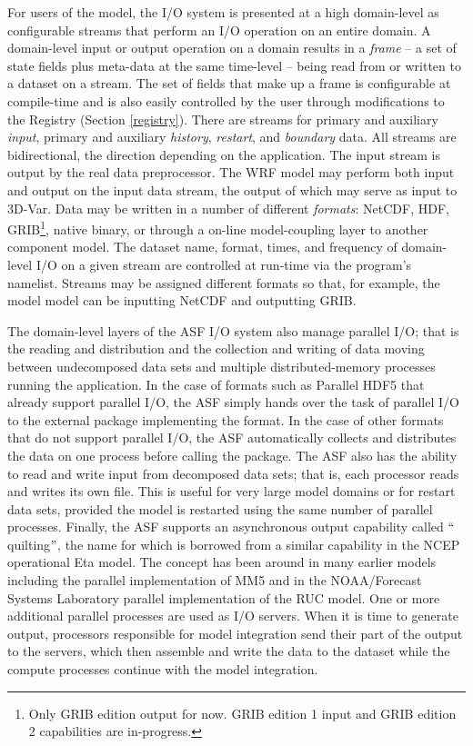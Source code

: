 For users of the model, the I/O system is presented at a high
domain-level as configurable streams that perform an I/O operation
on an entire domain. A domain-level input or output operation on a domain
results in a {\em frame} -- a set of state fields plus meta-data at the same
time-level -- being read from or written to a dataset on a stream.
The set of fields that make up a frame is configurable at compile-time
and is also easily controlled by the user through modifications to the
Registry (Section \ref{registry}).  There are streams for
primary and auxiliary {\em input}, primary and auxiliary {\em history}, {\em restart}, and
{\em boundary} data. All streams are bidirectional, the direction
depending on the application. The input stream is output by the real
data preprocessor. The WRF model may perform both input and output
on the input data stream, the output of which may serve as input to 3D-Var.
Data may be written in a number of different {\em formats}:
NetCDF, HDF, GRIB\footnote{Only GRIB edition output for now. GRIB edition 1 input and
GRIB edition 2 capabilities are in-progress.}, native binary, or through a
on-line model-coupling layer to another component model.  The dataset
name, format, times, and frequency of domain-level I/O on a given
stream are controlled at run-time via the program's namelist.  Streams
may be assigned different formats so that, for example, the model
model can be inputting NetCDF and outputting GRIB.

The domain-level layers of the ASF I/O system also manage parallel I/O;
that is the reading and distribution and the collection and writing of
data moving between undecomposed data sets and multiple
distributed-memory processes running the application.  In the case of
formats such as Parallel HDF5 that already support parallel I/O, the
ASF simply hands over the task of parallel I/O to the external package
implementing the format. In the case of other formats that do not
support parallel I/O, the ASF automatically collects and distributes
the data on one process before calling the package. The ASF also has
the ability to read and write input from decomposed data sets; that is,
each processor reads and writes its own file. This is useful for very
large model domains or for restart data sets, provided the model is
restarted using the same number of parallel processes. Finally, the ASF
supports an asynchronous output capability called $``$quilting$"$, the name
for which is borrowed from a similar capability in the NCEP operational
Eta model. The concept has been around in many earlier models including
the parallel implementation of MM5 and in the NOAA/Forecast Systems Laboratory parallel
implementation of the RUC model. One or more additional parallel
processes are used as I/O servers. When it is time to generate output,
processors responsible for model integration send their part of the
output to the servers, which then assemble and write the data to the
dataset while the compute processes continue with the model integration.

